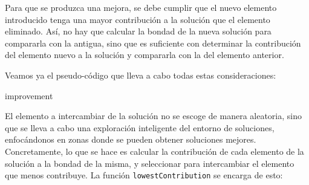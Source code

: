\documentclass[11pt,a4paper]{article}
\begin{document}
Para que se produzca una mejora, se debe cumplir que el nuevo elemento introducido tenga una mayor contribución a la solución que el elemento eliminado. Así, no hay que calcular la bondad de la nueva solución para compararla con la antigua, sino que es suficiente con determinar la contribución del elemento nuevo a la solución y compararla con la del elemento anterior. 

Veamos ya el pseudo-código que lleva a cabo todas estas consideraciones:

\begin{algorithm}[H]
	\caption{\sc improvement}
\end{algorithm}
\newpage
	
El elemento a intercambiar de la solución no se escoge de manera aleatoria, sino que se lleva a cabo una exploración inteligente del entorno de soluciones, enfocándonos en zonas donde se pueden obtener soluciones mejores. Concretamente, lo que se hace es calcular la contribución de cada elemento de la solución a la bondad de la misma, y seleccionar para intercambiar el elemento que menos contribuye. 
La función \lstinline|lowestContribution| se encarga de esto:
\end{document}
